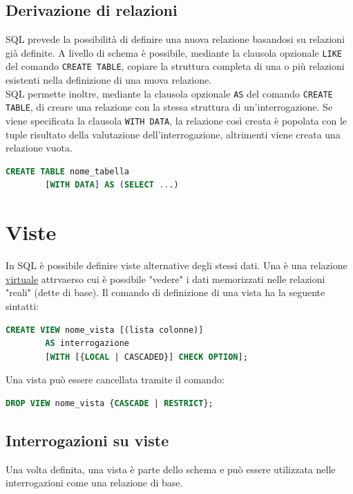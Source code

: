 \documentclass[12pt, a4paper]{report}
\begin{document}
    \subsection{Derivazione di relazioni}
    SQL prevede la possibilità di definire una nuova relazione basandosi su relazioni già definite. A livello di schema è possibile, mediante la clausola opzionale \texttt{LIKE} del comando \texttt{CREATE TABLE}, copiare la struttura completa di una o più relazioni esistenti nella definizione di una nuova relazione.\\
    SQL permette  inoltre, mediante la clausola opzionale \texttt{AS} del comando \texttt{CREATE TABLE}, di creare una relazione con la stessa struttura di un'interrogazione. Se viene specificata la clausola \texttt{WITH DATA}, la relazione così creata è popolata con le tuple risultato della valutazione dell'interrogazione, altrimenti viene creata una relazione vuota.
    \begin{lstlisting}[language=SQL]
        CREATE TABLE nome_tabella
        [WITH DATA] AS (SELECT ...)
    \end{lstlisting}
    \section{Viste}
    In SQL è possibile definire viste alternative degli stessi dati. Una  è una relazione \underline{virtuale} attrvaerso cui è possibile "vedere" i dati memorizzati nelle relazioni "reali" (dette di base). Il comando di definizione di una vista ha la seguente sintatti:
    \begin{lstlisting}[language=SQL]
        CREATE VIEW nome_vista [(lista colonne)]
        AS interrogazione
        [WITH [{LOCAL | CASCADED}] CHECK OPTION];
    \end{lstlisting}
    Una vista può essere cancellata tramite il comando:
    \begin{lstlisting}[language=SQL]
        DROP VIEW nome_vista {CASCADE | RESTRICT};
    \end{lstlisting}
    \subsection{Interrogazioni su viste}
    Una volta definita, una vista è parte dello schema e può essere utilizzata nelle interrogazioni come una relazione di base.
\end{document}
